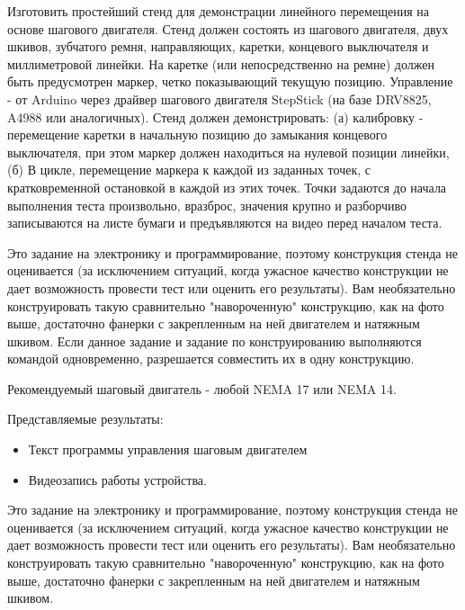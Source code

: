 

Изготовить простейший стенд для демонстрации линейного перемещения на основе шагового двигателя. Стенд должен состоять из шагового двигателя, двух шкивов, зубчатого ремня, направляющих, каретки, концевого выключателя и миллиметровой линейки. На каретке (или непосредственно на ремне) должен быть предусмотрен маркер, четко показывающий текущую позицию.  Управление - от Arduino через драйвер шагового двигателя StepStick (на базе DRV8825, A4988 или аналогичных). Стенд должен демонстрировать: (а) калибровку - перемещение каретки в начальную позицию до замыкания концевого выключателя, при этом маркер должен находиться на нулевой позиции линейки, (б) В цикле, перемещение маркера к каждой из заданных точек, с кратковременной остановкой в каждой из этих точек.  Точки задаются до начала выполнения теста произвольно, вразброс, значения крупно и разборчиво записываются на листе бумаги и предъявляются на видео перед началом теста.  

Это задание на электронику и программирование, поэтому конструкция стенда не оценивается (за исключением ситуаций, когда ужасное качество конструкции не дает возможность провести тест или оценить его результаты). Вам необязательно конструировать такую сравнительно "навороченную" конструкцию, как на фото выше,  достаточно фанерки с закрепленным на ней двигателем и натяжным шкивом. Если данное задание и задание по конструированию выполняются командой одновременно, разрешается совместить их в одну конструкцию.

Рекомендуемый шаговый двигатель - любой NEMA 17 или NEMA 14.

Представляемые результаты:

\begin{itemize}
    \item Текст программы управления шаговым двигателем
    \item Видеозапись работы устройства.
\end{itemize}

\solutionSection

Это задание на электронику и программирование, поэтому конструкция стенда не оценивается (за исключением ситуаций, когда ужасное качество конструкции не дает возможность провести тест или оценить его результаты). Вам необязательно конструировать такую сравнительно "навороченную" конструкцию, как на фото выше,  достаточно фанерки с закрепленным на ней двигателем и натяжным шкивом. 

